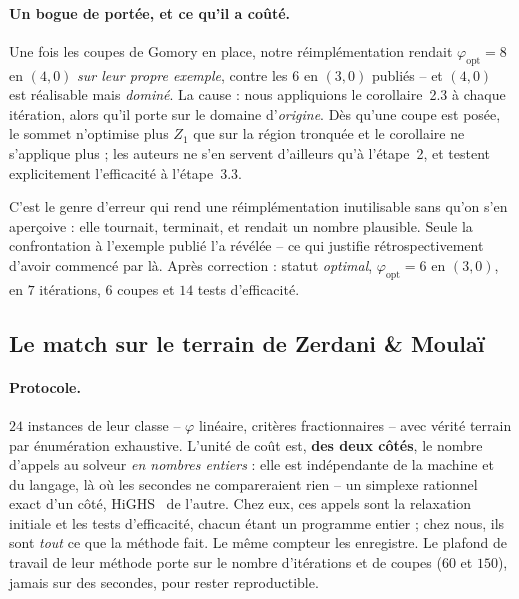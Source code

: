 \documentclass[11pt,a4paper]{article}
\theoremstyle{plain}
\theoremstyle{remark}
\begin{document}
\paragraph{Un bogue de portée, et ce qu'il a coûté.} Une fois les coupes de
Gomory en place, notre réimplémentation rendait $\varphi_{\text{opt}}=8$ en
$(4,0)$ \emph{sur leur propre exemple}, contre les $6$ en $(3,0)$ publiés --
et $(4,0)$ est réalisable mais \emph{dominé}. La cause : nous appliquions le
corollaire~2.3 à chaque itération, alors qu'il porte sur le domaine
d'\emph{origine}. Dès qu'une coupe est posée, le sommet n'optimise plus
$Z_1$ que sur la région tronquée et le corollaire ne s'applique plus ; les
auteurs ne s'en servent d'ailleurs qu'à l'étape~2, et testent explicitement
l'efficacité à l'étape~3.3.

C'est le genre d'erreur qui rend une réimplémentation inutilisable sans
qu'on s'en aperçoive : elle tournait, terminait, et rendait un nombre
plausible. Seule la confrontation à l'exemple publié l'a révélée -- ce qui
justifie rétrospectivement d'avoir commencé par là. Après correction :
statut \emph{optimal}, $\varphi_{\text{opt}}=6$ en $(3,0)$, en $7$
itérations, $6$ coupes et $14$ tests d'efficacité.

\subsection{Le match sur le terrain de Zerdani \& Moulaï}
\label{sec:matchzm}

\paragraph{Protocole.} $24$ instances de leur classe -- $\varphi$ linéaire,
critères fractionnaires -- avec vérité terrain par énumération exhaustive.
L'unité de coût est, \textbf{des deux côtés}, le nombre d'appels au solveur
\emph{en nombres entiers} : elle est indépendante de la machine et du
langage, là où les secondes ne compareraient rien -- un simplexe rationnel
exact d'un côté, HiGHS~\cite{huangfu2018} de l'autre. Chez eux, ces appels sont la relaxation
initiale et les tests d'efficacité, chacun étant un programme entier ; chez
nous, ils sont \emph{tout} ce que la méthode fait. Le même compteur les
enregistre. Le plafond de travail de leur méthode porte sur le nombre
d'itérations et de coupes ($60$ et $150$), jamais sur des secondes, pour
rester reproductible.
\end{document}
